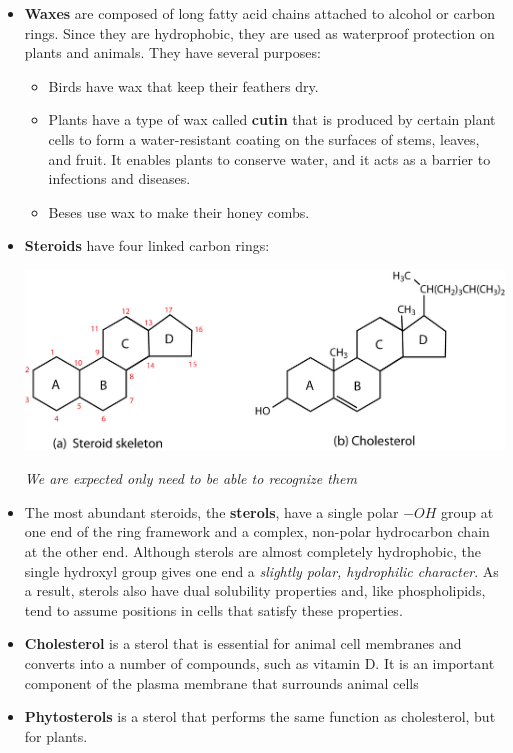 \documentclass[letterpaper]{article}
\numberwithin{equation}{section}
\theoremstyle{classic}
\begin{document}
\begin{itemize}
    \item \textbf{Waxes} are composed of long fatty acid chains attached
    to alcohol or carbon rings. Since they are hydrophobic, they are used as waterproof protection on plants and animals. They have several purposes:
    \begin{itemize}
        \item Birds have wax that keep their feathers dry.
        \item Plants have a type of wax called \textbf{cutin} that is produced by certain plant cells to form a water-resistant coating on the surfaces of stems, leaves, and fruit. It enables plants to conserve water, and it acts as a barrier to infections and diseases.
        \item Beses use wax to make their honey combs.
    \end{itemize}
    \item \textbf{Steroids} have four linked carbon rings:
    \begin{center}\includegraphics[width=0.7\linewidth]{A8.jpg}\end{center}
    \textit{We are expected only need to be able to recognize them} 
    \item The most abundant steroids, the \textbf{sterols}, have a single polar $-OH$ group at one end of the ring framework and a complex, non-polar hydrocarbon chain at the other end. Although sterols are almost completely hydrophobic, the single hydroxyl group gives one end a \textit{slightly polar, hydrophilic character}. As a result, sterols also have dual solubility properties and, like phospholipids, tend to assume positions in cells that satisfy these properties.
    \item \textbf{Cholesterol} is a sterol that is essential for animal cell membranes and converts into a number of compounds, such as vitamin D. It is an important component of the plasma membrane that surrounds animal cells
    \item \textbf{Phytosterols} is a sterol that performs the same function as cholesterol, but for plants.

\end{itemize}
\end{document}
